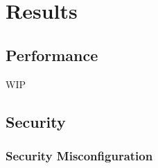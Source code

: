 
\chapter{Results}\label{cha:results}

\section{Performance}

WIP


% 
% 

% 
% 

% 
% 

% 
% 

% 
% 

\section{Security}
\subsection{Security Misconfiguration}
